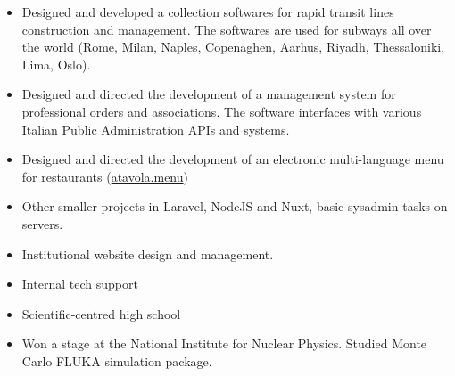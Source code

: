\documentclass[10pt,a4paper]{altacv}
\begin{document}

\begin{fullwidth}
\makecvheader
\end{fullwidth}


\begin{itemize}
\item Designed and developed a collection softwares for rapid transit lines construction and management. The softwares are used for subways all over the world (Rome, Milan, Naples, Copenaghen, Aarhus, Riyadh, Thessaloniki, Lima, Oslo).
\item Designed and directed the development of a management system for professional orders and associations. The software interfaces with various Italian Public Administration APIs and systems.
\item Designed and directed the development of an electronic multi-language menu for restaurants (\href{https://atavola.menu}{atavola.menu})
\item Other smaller projects in Laravel, NodeJS and Nuxt, basic sysadmin tasks on servers.
\end{itemize}

\divider

\begin{itemize}
\item Institutional website design and management.
\item Internal tech support
\end{itemize}


\begin{itemize}
\item Scientific-centred high school
\item Won a stage at the National Institute for Nuclear Physics. Studied Monte Carlo FLUKA simulation package.
\end{itemize}
\end{document}
